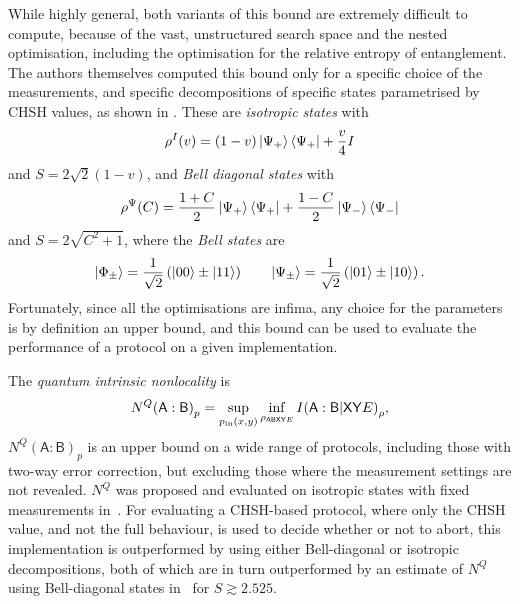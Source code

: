 \documentclass[10pt, a4paper]{article}
\numberwithin{equation}{section} %
\theoremstyle{definition}
\theoremstyle{plain}
\newcommand{\?}{\mathrel{?}} %
\newcommand{\crv}[1]{\mathsf{#1}}
\begin{document}
      While highly general, both variants of this bound are extremely difficult to compute, because of the vast, unstructured search space and the nested optimisation, including the optimisation for the relative entropy of entanglement. The authors themselves computed this bound only for a specific choice of the measurements, and specific decompositions of specific states parametrised by CHSH values, as shown in . These are \emph{isotropic states} with
      \begin{equation}
        \rho^{I}(v) = (1-v)\ket{\Psi_+}\bra{\Psi_+} + \frac{v}{4}I
      \end{equation}
      and \(S = 2\sqrt{2}(1-v)\), and \emph{Bell diagonal states} with
      \begin{equation}
        \rho^{\Psi}(C) = \frac{1+C}{2}\ket{\Psi_+}\bra{\Psi_+} + \frac{1-C}{2}\ket{\Psi_-}\bra{\Psi_-}
      \end{equation}
      and \(S = 2\sqrt{C^2+1}\), where the \emph{Bell states} are
      \begin{equation}
        \ket{\Phi_{\pm}} = \frac{1}{\sqrt{2}}\left( \ket{00} \pm \ket{11} \right) \qquad \ket{\Psi_{\pm}} = \frac{1}{\sqrt{2}}\left( \ket{01} \pm \ket{10} \right).
      \end{equation}
      Fortunately, since all the optimisations are infima, any choice for the parameters is by definition an upper bound, and this bound can be used to evaluate the performance of a protocol on a given implementation.


      The \emph{quantum intrinsic nonlocality} is~\cite{DIQKD_Limits}
      \begin{equation}
        N^Q{(\crv{A}:\crv{B})}_p = \sup_{p_{\rm in}(x,y)} \inf_{\rho_{\crv{ABXY}E}} I{(\crv{A}:\crv{B}|\crv{XY}E)}_{\rho},
      \end{equation}
       \(N^Q{(\crv{A}:\crv{B})}_p\) is an upper bound on a wide range of protocols, including those with two-way error correction, but excluding those where the measurement settings are not revealed. \(N^Q\) was proposed and evaluated on isotropic states with fixed measurements in~\cite{DIQKD_Limits}. For evaluating a CHSH-based protocol, where only the CHSH value, and not the full behaviour, is used to decide whether or not to abort, this implementation is outperformed by  using either Bell-diagonal or isotropic decompositions, both of which are in turn outperformed by an estimate of \(N^Q\) using Bell-diagonal states in~\cite[Appendix B]{RevisedPeres} for \(S \gtrsim 2.525\).
\end{document}
